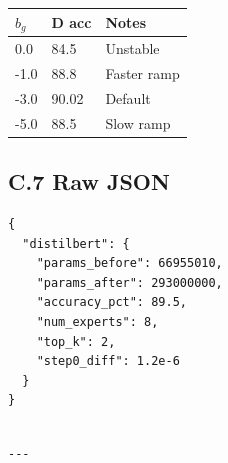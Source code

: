 \begin{table}[H]
\centering
\small
\begin{tabular}{lll}
\toprule
\textbf{$b_g$} & \textbf{D acc} & \textbf{Notes} \\
\midrule
0.0 & 84.5 & Unstable \\
-1.0 & 88.8 & Faster ramp \\
-3.0 & 90.02 & Default \\
-5.0 & 88.5 & Slow ramp \\
\bottomrule
\end{tabular}
\end{table}

\subsection{C.7 Raw JSON}

\begin{lstlisting}
{
  "distilbert": {
    "params_before": 66955010,
    "params_after": 293000000,
    "accuracy_pct": 89.5,
    "num_experts": 8,
    "top_k": 2,
    "step0_diff": 1.2e-6
  }
}
\end{lstlisting}
\begin{lstlisting}

---
\end{lstlisting}